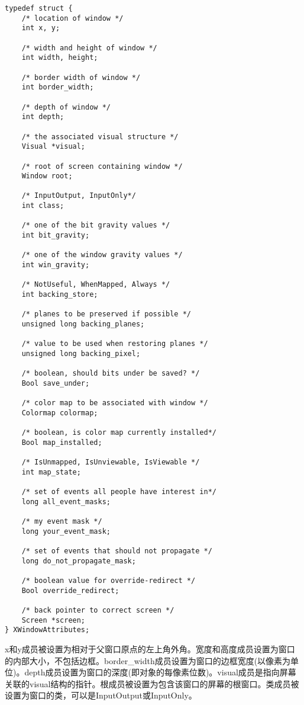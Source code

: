 \begin{lstlisting}
typedef struct {
	/* location of window */
	int x, y;    
	
	/* width and height of window */                
	int width, height; 
	
	/* border width of window */           
	int border_width; 
	
	/* depth of window */            
	int depth;  
	
	/* the associated visual structure */                  
	Visual *visual; 
	
	/* root of screen containing window */              
	Window root;
	
	/* InputOutput, InputOnly*/                  
	int class;  
	
	/* one of the bit gravity values */                  
	int bit_gravity; 
	
	/* one of the window gravity values */             
	int win_gravity;
	
	/* NotUseful, WhenMapped, Always */              
	int backing_store;   
	
	/* planes to be preserved if possible */         
	unsigned long backing_planes; 
	
	/* value to be used when restoring planes */
	unsigned long backing_pixel; 
	
	/* boolean, should bits under be saved? */ 
	Bool save_under;    
	
	/* color map to be associated with window */          
	Colormap colormap; 
	
	/* boolean, is color map currently installed*/           
	Bool map_installed; 
	
	/* IsUnmapped, IsUnviewable, IsViewable */          
	int map_state;        
	
	/* set of events all people have interest in*/        
	long all_event_masks; 
	
	/* my event mask */        
	long your_event_mask;   
	
	/* set of events that should not propagate */      
	long do_not_propagate_mask;
	
	/* boolean value for override-redirect */   
	Bool override_redirect;
	
	/* back pointer to correct screen */       
	Screen *screen;               
} XWindowAttributes;
\end{lstlisting}

x和y成员被设置为相对于父窗口原点的左上角外角。宽度和高度成员设置为窗口的内部大小，不包括边框。border\_width成员设置为窗口的边框宽度(以像素为单位)。depth成员设置为窗口的深度(即对象的每像素位数)。visual成员是指向屏幕关联的visual结构的指针。根成员被设置为包含该窗口的屏幕的根窗口。类成员被设置为窗口的类，可以是InputOutput或InputOnly。

